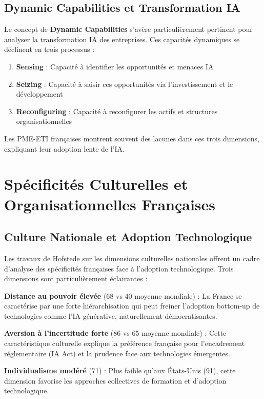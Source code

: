 \documentclass[12pt,a4paper]{report}
\begin{document}
\subsection{Dynamic Capabilities et Transformation IA}

Le concept de \textbf{Dynamic Capabilities} \cite{teece2007dynamic} s'avère particulièrement pertinent pour analyser la transformation IA des entreprises. Ces capacités dynamiques se déclinent en trois processus :

\begin{enumerate}
\item \textbf{Sensing} : Capacité à identifier les opportunités et menaces IA
\item \textbf{Seizing} : Capacité à saisir ces opportunités via l'investissement et le développement
\item \textbf{Reconfiguring} : Capacité à reconfigurer les actifs et structures organisationnelles
\end{enumerate}

Les PME-ETI françaises montrent souvent des lacunes dans ces trois dimensions, expliquant leur adoption lente de l'IA.

\section{Spécificités Culturelles et Organisationnelles Françaises}

\subsection{Culture Nationale et Adoption Technologique}

Les travaux de Hofstede \cite{hofstede2001culture} sur les dimensions culturelles nationales offrent un cadre d'analyse des spécificités françaises face à l'adoption technologique. Trois dimensions sont particulièrement éclairantes :

\textbf{Distance au pouvoir élevée} (68 vs 40 moyenne mondiale) : La France se caractérise par une forte hiérarchisation qui peut freiner l'adoption bottom-up de technologies comme l'IA générative, naturellement démocratisantes.

\textbf{Aversion à l'incertitude forte} (86 vs 65 moyenne mondiale) : Cette caractéristique culturelle explique la préférence française pour l'encadrement réglementaire (IA Act) et la prudence face aux technologies émergentes.

\textbf{Individualisme modéré} (71) : Plus faible qu'aux États-Unis (91), cette dimension favorise les approches collectives de formation et d'adoption technologique.
\end{document}
